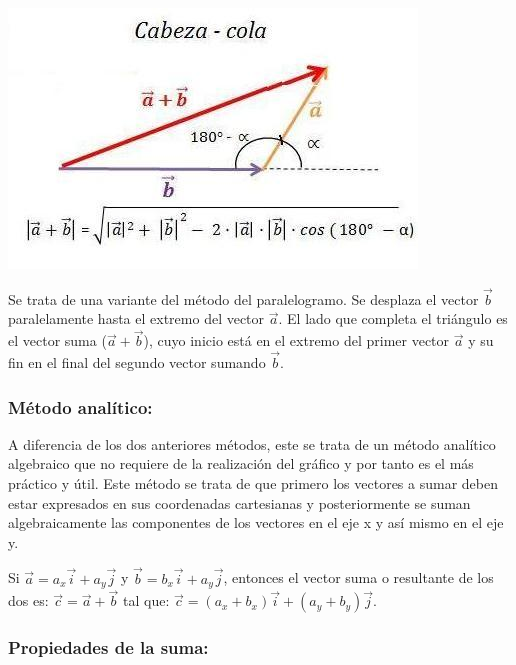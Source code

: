 \documentclass[a5paper,pagesize,10pt,bibtotoc,pointlessnumbers,
normalheadings,DIV=9,fleqn,x11names,table,twoside=false]{scrbook}
\begin{document}
\begin{center}
 \includegraphics[scale=0.7]{images/suma-vectores-metodo-cabeza-cola.jpg}
\end{center}

Se trata de una variante del método del paralelogramo. Se desplaza el vector $\vec{b}$ paralelamente hasta el extremo 
del vector $\vec{a}$. El lado que completa el triángulo es el vector suma ($\vec{a} + \vec{b}$), cuyo inicio está en el 
extremo del primer vector $\vec{a}$ y su fin en el final del segundo vector sumando $\vec{b}$. 
    
\subsubsection{Método analítico:}     

A diferencia de los dos anteriores métodos, este se trata de un método analítico algebraico que no requiere de la 
realización del gráfico y por tanto es el más práctico y útil. Este método se trata de que primero los vectores a sumar 
deben estar expresados en sus coordenadas cartesianas y posteriormente se suman algebraicamente las componentes de los 
vectores en el eje x y así mismo en el eje y.

\begin{tcolorbox}
 Si $\vec{a} = a_x\vec{i}+a_y\vec{j}$ y $\vec{b} = b_x\vec{i}+a_y\vec{j}$, entonces el vector suma o resultante de los 
dos es: $\vec{c} =\vec{a}+\vec{b}$ tal que: $\vec{c} = (a_x + b_x)\vec{i} +(a_y+b_y)\vec{j}$. 
\end{tcolorbox}

\subsubsection{Propiedades de la suma:}
\end{document}
